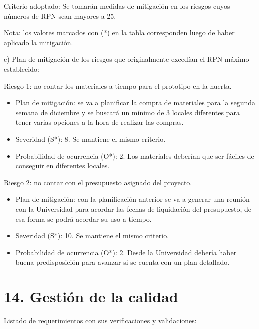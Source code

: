 \documentclass[
11pt, %
codirector, %
]{charter}
\begin{document}
Criterio adoptado: 
Se tomarán medidas de mitigación en los riesgos cuyos números de RPN sean mayores a 25.

Nota: los valores marcados con (*) en la tabla corresponden luego de haber aplicado la mitigación.

c) Plan de mitigación de los riesgos que originalmente excedían el RPN máximo establecido:
 
Riesgo 1: no contar los materiales a tiempo para el prototipo en la huerta.
\begin{itemize}
	\item Plan de mitigación: se va a planificar la compra de materiales para la segunda semana de diciembre y se buscará un mínimo de 3 locales diferentes para tener varias opciones a la hora de realizar las compras.
	\item Severidad (S*): 8. Se mantiene el mismo criterio.
	\item Probabilidad de ocurrencia (O*): 2. Los materiales deberían que ser fáciles de conseguir en diferentes locales.
\end{itemize}
Riesgo 2: no contar con el presupuesto asignado del proyecto.
\begin{itemize}
	\item Plan de mitigación: con la planificación anterior se va a generar una reunión con la Universidad para acordar las fechas de liquidación del presupuesto, de esa forma se podrá acordar su uso a tiempo.
	\item Severidad (S*): 10. Se mantiene el mismo criterio.
	\item Probabilidad de ocurrencia (O*): 2. Desde la Universidad debería haber buena predisposición para avanzar si se cuenta con un plan detallado.
\end{itemize}

\section{14. Gestión de la calidad}
\label{sec:calidad}

Listado de requerimientos con sus verificaciones y validaciones:
\end{document}
